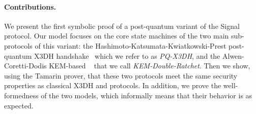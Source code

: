 



\paragraph{Contributions.} We present the first symbolic proof of a post-quantum variant of the Signal protocol. Our model focuses on the core state machines of the two main sub-protocols of this variant: the Hashimoto-Katsumata-Kwiatkowski-Prest post-quantum X3DH handshake~\cite{DBLP:conf/pkc/HashimotoKKP21} which we refer to as \emph{PQ-X3DH}, and the Alwen-Coretti-Dodis KEM-based \dr~\cite{EC:AlwCorDod19} that we call \emph{KEM-Double-Ratchet}. Then we show, using the Tamarin prover, that these two protocols meet the same security properties as classical X3DH and \dr protocols. In addition, we prove the well-formedness of the two models, which informally means that their behavior is as expected.

